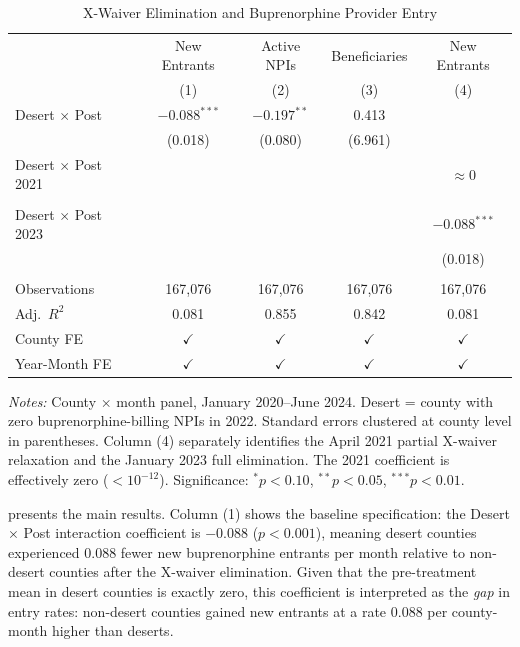 \documentclass[12pt]{article}
\begin{document}
\begin{table}[htbp]
\centering
\caption{X-Waiver Elimination and Buprenorphine Provider Entry}
\label{tab:did_main}
\begin{threeparttable}
\begin{tabular}{lcccc}
\toprule
 & New Entrants & Active NPIs & Beneficiaries & New Entrants \\
 & (1) & (2) & (3) & (4) \\
\midrule
Desert $\times$ Post & $-0.088^{***}$ & $-0.197^{**}$ & 0.413 & \\
 & (0.018) & (0.080) & (6.961) & \\
Desert $\times$ Post 2021 & & & & $\approx 0$ \\
 & & & & \\
Desert $\times$ Post 2023 & & & & $-0.088^{***}$ \\
 & & & & (0.018) \\
\\
Observations & 167,076 & 167,076 & 167,076 & 167,076 \\
Adj.\ $R^2$ & 0.081 & 0.855 & 0.842 & 0.081 \\
County FE & $\checkmark$ & $\checkmark$ & $\checkmark$ & $\checkmark$ \\
Year-Month FE & $\checkmark$ & $\checkmark$ & $\checkmark$ & $\checkmark$ \\
\bottomrule
\end{tabular}
\begin{tablenotes}[flushleft]\small
\item \textit{Notes:} County $\times$ month panel, January 2020--June 2024. Desert = county with zero buprenorphine-billing NPIs in 2022. Standard errors clustered at county level in parentheses. Column (4) separately identifies the April 2021 partial X-waiver relaxation and the January 2023 full elimination. The 2021 coefficient is effectively zero ($< 10^{-12}$). Significance: $^{*}p<0.10$, $^{**}p<0.05$, $^{***}p<0.01$.
\end{tablenotes}
\end{threeparttable}
\end{table}

 presents the main results. Column (1) shows the baseline specification: the Desert $\times$ Post interaction coefficient is $-0.088$ ($p < 0.001$), meaning desert counties experienced 0.088 fewer new buprenorphine entrants per month relative to non-desert counties after the X-waiver elimination. Given that the pre-treatment mean in desert counties is exactly zero, this coefficient is interpreted as the \textit{gap} in entry rates: non-desert counties gained new entrants at a rate 0.088 per county-month higher than deserts.
\end{document}

